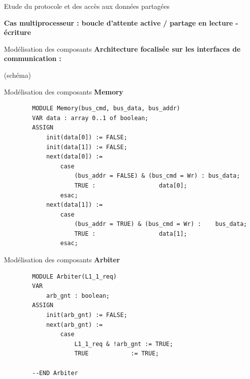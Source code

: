 \documentclass{beamer}
\begin{document}
\begin{frame}{Etude du protocole et des accès aux données partagées}

    \textbf{Cas multiprocesseur : boucle d’attente active / partage en lecture - \hspace*{3.8cm} écriture}
    \vspace*{1.52cm}

\end{frame}

\begin{frame}[fragile]{Modélisation des composants}
    \textbf{Architecture focalisée sur les interfaces de communication :}

    \centering
    (schéma)
\end{frame}

\begin{frame}[fragile]{Modélisation des composants}
    \textbf{Memory}
    \begin{lstlisting}
        MODULE Memory(bus_cmd, bus_data, bus_addr)
        VAR data : array 0..1 of boolean;
        ASSIGN
            init(data[0]) := FALSE;
            init(data[1]) := FALSE;
            next(data[0]) :=
                case
                    (bus_addr = FALSE) & (bus_cmd = Wr) : bus_data;
                    TRUE :					data[0];
                esac;
            next(data[1]) :=
                case
                    (bus_addr = TRUE) & (bus_cmd = Wr) :	bus_data;
                    TRUE :					data[1];
                esac;
    \end{lstlisting}
\end{frame}

\begin{frame}[fragile]{Modélisation des composants}
    \textbf{Arbiter}
    \begin{lstlisting}
        MODULE Arbiter(L1_1_req)
        VAR
            arb_gnt : boolean;
        ASSIGN
            init(arb_gnt) := FALSE;
            next(arb_gnt) := 
                case
                    L1_1_req & !arb_gnt	:= TRUE;
                    TRUE			:= TRUE;
            
        --END Arbiter
    \end{lstlisting}
\end{frame}
\end{document}
